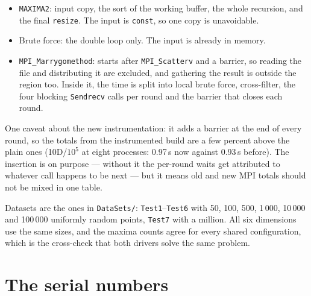 \documentclass[11pt,a4paper]{article}
\newcommand{\code}[1]{\texttt{#1}}
\begin{document}
\begin{itemize}
  \item \code{MAXIMA2}: input copy, the sort of the working buffer, the whole
        recursion, and the final \code{resize}. The input is \code{const}, so
        one copy is unavoidable.
  \item Brute force: the double loop only. The input is already in memory.
  \item \code{MPI\_Marrygomethod}: starts after \code{MPI\_Scatterv} and a
        barrier, so reading the file and distributing it are excluded, and
        gathering the result is outside the region too. Inside it, the time is
        split into local brute force, cross-filter, the four blocking
        \code{Sendrecv} calls per round and the barrier that closes each round.
\end{itemize}

One caveat about the new instrumentation: it adds a barrier at the end of every
round, so the totals from the instrumented build are a few percent above the
plain ones (10D/$10^5$ at eight processes: 0.97\,s now against 0.93\,s before).
The insertion is on purpose --- without it the per-round waits get attributed to
whatever call happens to be next --- but it means old and new MPI totals should
not be mixed in one table.

Datasets are the ones in \code{DataSets/}: \code{Test1}--\code{Test6} with 50,
100, 500, 1\,000, 10\,000 and 100\,000 uniformly random points, \code{Test7}
with a million. All six dimensions use the same sizes, and the maxima counts
agree for every shared configuration, which is the cross-check that both drivers
solve the same problem.

\section{The serial numbers}
\end{document}
